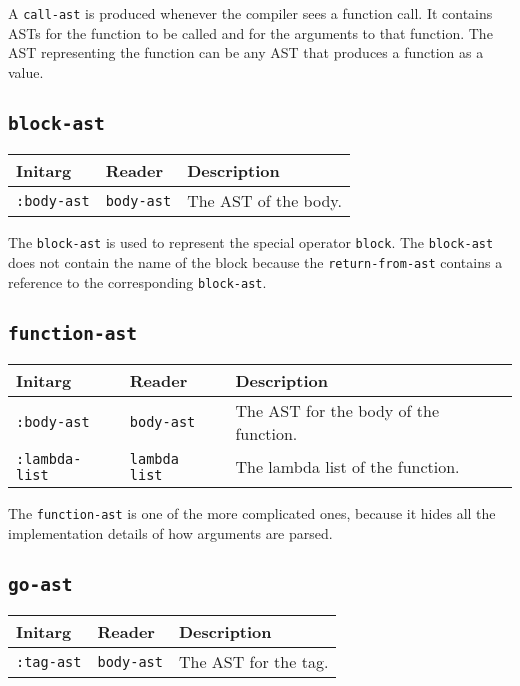 A \texttt{call-ast} is produced whenever the compiler sees a function
call.  It contains ASTs for the function to be called and for the
arguments to that function.  The AST representing the function can be
any AST that produces a function as a value.

\subsection{\texttt{block-ast}}
\label{block-ast}

\begin{tabular}{|l|l|l|}
\hline
Initarg & Reader & Description\\
\hline\hline
\texttt{:body-ast} & \texttt{body-ast} & The AST of the body.\\
\hline
\end{tabular}

The \texttt{block-ast} is used to represent the \cl{} special operator
\texttt{block}.  The \texttt{block-ast} does not contain the name of
the block because the \texttt{return-from-ast} contains a reference to
the corresponding \texttt{block-ast}.

\subsection{\texttt{function-ast}}
\label{function-ast}

\begin{tabular}{|l|l|l|}
\hline
Initarg & Reader & Description\\
\hline\hline
\texttt{:body-ast} & \texttt{body-ast} & The AST for the body of the function.\\
\hline
\texttt{:lambda-list} & \texttt{lambda list} & The lambda list of the function.\\
\hline
\end{tabular}

The \texttt{function-ast} is one of the more complicated ones, because
it hides all the implementation details of how arguments are parsed. 

\subsection{\texttt{go-ast}}
\label{go-ast}

\begin{tabular}{|l|l|l|}
\hline
Initarg & Reader & Description\\
\hline\hline
\texttt{:tag-ast} & \texttt{body-ast} & The AST for the tag.\\
\hline
\end{tabular}

